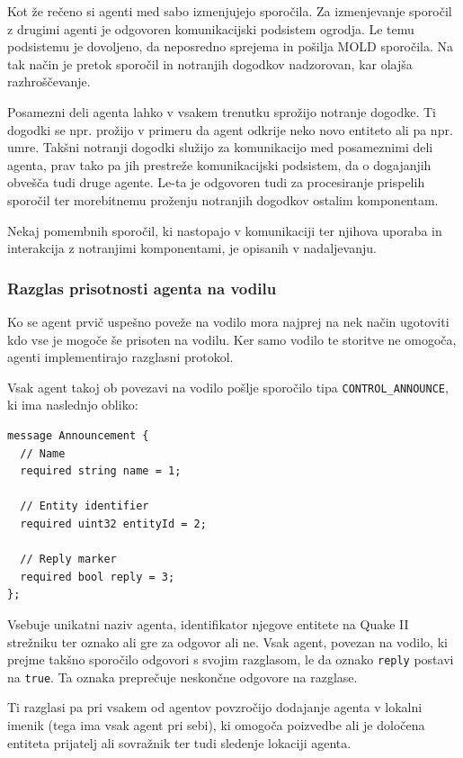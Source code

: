\documentclass[a4paper,10pt]{article}
\begin{document}
Kot že rečeno si agenti med sabo izmenjujejo sporočila. Za izmenjevanje sporočil z drugimi agenti je odgovoren komunikacijski podsistem ogrodja. Le temu podsistemu je dovoljeno, da neposredno sprejema in pošilja MOLD sporočila. Na tak način je pretok sporočil in notranjih dogodkov nadzorovan, kar olajša razhroščevanje.

Posamezni deli agenta lahko v vsakem trenutku sprožijo notranje dogodke. Ti dogodki se npr. prožijo v primeru da agent odkrije neko novo entiteto ali pa npr. umre. Takšni notranji dogodki služijo za komunikacijo med posameznimi deli agenta, prav tako pa jih prestreže komunikacijski podsistem, da o dogajanjih obvešča tudi druge agente. Le-ta je odgovoren tudi za procesiranje prispelih sporočil ter morebitnemu proženju notranjih dogodkov ostalim komponentam.

Nekaj pomembnih sporočil, ki nastopajo v komunikaciji ter njihova uporaba in interakcija z notranjimi komponentami, je opisanih v nadaljevanju.

\subsubsection{Razglas prisotnosti agenta na vodilu}

Ko se agent prvič uspešno poveže na vodilo mora najprej na nek način ugotoviti kdo vse je mogoče še prisoten na vodilu. Ker samo vodilo te storitve ne omogoča, agenti implementirajo razglasni protokol.

Vsak agent takoj ob povezavi na vodilo pošlje sporočilo tipa \texttt{CONTROL\_ANNOUNCE}, ki ima naslednjo obliko:
\begin{verbatim}
message Announcement {
  // Name
  required string name = 1;
  
  // Entity identifier
  required uint32 entityId = 2;
  
  // Reply marker
  required bool reply = 3;
};
\end{verbatim}

\noindent
Vsebuje unikatni naziv agenta, identifikator njegove entitete na Quake II strežniku ter oznako ali gre za odgovor ali ne. Vsak agent, povezan na vodilo, ki prejme takšno sporočilo odgovori s svojim razglasom, le da oznako \texttt{reply} postavi na \texttt{true}. Ta oznaka preprečuje neskončne odgovore na razglase.

Ti razglasi pa pri vsakem od agentov povzročijo dodajanje agenta v lokalni imenik (tega ima vsak agent pri sebi), ki omogoča poizvedbe ali je določena entiteta prijatelj ali sovražnik ter tudi sledenje lokaciji agenta.
\end{document}
